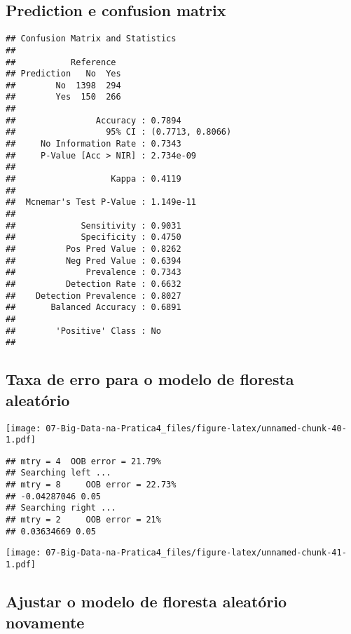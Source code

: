 \documentclass[]{article}
\begin{document}
\hypertarget{prediction-e-confusion-matrix}{%
\subsection{Prediction e confusion
matrix}\label{prediction-e-confusion-matrix}}

\begin{verbatim}
## Confusion Matrix and Statistics
## 
##           Reference
## Prediction   No  Yes
##        No  1398  294
##        Yes  150  266
##                                           
##                Accuracy : 0.7894          
##                  95% CI : (0.7713, 0.8066)
##     No Information Rate : 0.7343          
##     P-Value [Acc > NIR] : 2.734e-09       
##                                           
##                   Kappa : 0.4119          
##                                           
##  Mcnemar's Test P-Value : 1.149e-11       
##                                           
##             Sensitivity : 0.9031          
##             Specificity : 0.4750          
##          Pos Pred Value : 0.8262          
##          Neg Pred Value : 0.6394          
##              Prevalence : 0.7343          
##          Detection Rate : 0.6632          
##    Detection Prevalence : 0.8027          
##       Balanced Accuracy : 0.6891          
##                                           
##        'Positive' Class : No              
## 
\end{verbatim}

\hypertarget{taxa-de-erro-para-o-modelo-de-floresta-aleatuxf3rio}{%
\subsection{Taxa de erro para o modelo de floresta
aleatório}\label{taxa-de-erro-para-o-modelo-de-floresta-aleatuxf3rio}}

\texttt{[image: 07-Big-Data-na-Pratica4\_files/figure-latex/unnamed-chunk-40-1.pdf]}

\begin{verbatim}
## mtry = 4  OOB error = 21.79% 
## Searching left ...
## mtry = 8     OOB error = 22.73% 
## -0.04287046 0.05 
## Searching right ...
## mtry = 2     OOB error = 21% 
## 0.03634669 0.05
\end{verbatim}

\texttt{[image: 07-Big-Data-na-Pratica4\_files/figure-latex/unnamed-chunk-41-1.pdf]}

\hypertarget{ajustar-o-modelo-de-floresta-aleatuxf3rio-novamente}{%
\subsection{Ajustar o modelo de floresta aleatório
novamente}\label{ajustar-o-modelo-de-floresta-aleatuxf3rio-novamente}}
\end{document}
